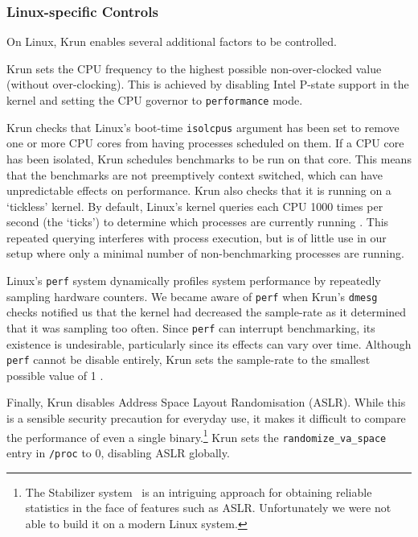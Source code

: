 \documentclass[10pt,preprint]{sigplanconf}
\newcommand{\krun}{Krun\xspace}
\begin{document}
\subsubsection{Linux-specific Controls}

On Linux, \krun enables several additional factors to be controlled.

\krun sets the CPU frequency to the highest possible non-over-clocked value
(without over-clocking). This is achieved by disabling Intel P-state support in
the kernel  and setting the CPU governor to \texttt{performance} mode.

\krun checks that Linux's boot-time \texttt{isolcpus} argument has been set to
remove one or more CPU cores from having processes scheduled on them. If a CPU
core has been isolated, \krun {} schedules benchmarks to be
run on that core. This means that the benchmarks are not preemptively context
switched, which can have unpredictable effects on performance. \krun also checks
that it is running on a `tickless' kernel. By default, Linux's kernel queries
each CPU 1000 times per second (the `ticks') to determine which processes are
currently running . This repeated querying
interferes with process execution, but is of little use in our setup where only
a minimal number of non-benchmarking processes are running.

Linux's \texttt{perf} system dynamically profiles system performance by
repeatedly sampling hardware counters. We became aware of \texttt{perf} when
\krun's \texttt{dmesg} checks notified us that the kernel had decreased the
sample-rate as it determined that it was sampling too often. Since \texttt{perf}
can interrupt benchmarking, its existence is undesirable, particularly since its
effects can vary over time. Although \texttt{perf} cannot be disable entirely,
\krun sets the sample-rate to the smallest possible value of 1 .

Finally, \krun disables Address Space Layout Randomisation (ASLR). While this is
a sensible security precaution for everyday use, it makes it difficult to
compare the performance of even a single binary.\footnote{The Stabilizer
system~\cite{curtsinger} is an intriguing approach for obtaining reliable
statistics in the face of features such as ASLR. Unfortunately we were not able
to build it on a modern Linux system.} \krun sets the
\texttt{randomize\_va\_space} entry in \texttt{/proc} to 0, disabling ASLR
globally.
\end{document}
